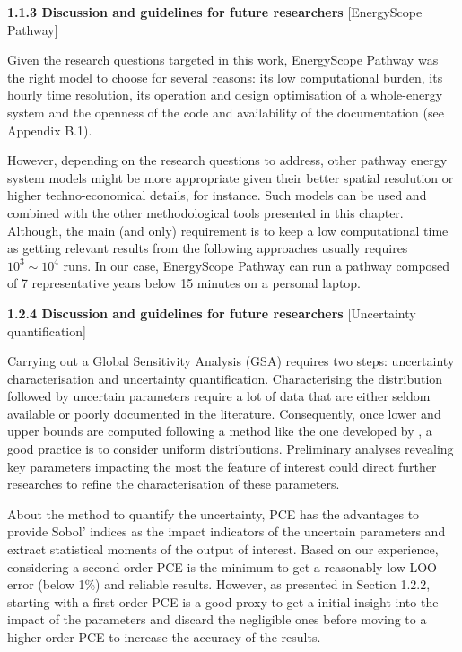 \documentclass[12pt,a4paper]{article}
\begin{document}
\begin{mdframed}[style=manuscript]
\textbf{1.1.3 Discussion and guidelines for future researchers} [EnergyScope Pathway]

Given the research questions targeted in this work, EnergyScope Pathway was the right model to choose for several reasons: its low computational burden, its hourly time resolution, its operation and design optimisation of a whole-energy system and the openness of the code and availability of the documentation (see Appendix B.1). 

However, depending on the research questions to address, other pathway energy system models might be more appropriate given their better spatial resolution or higher techno-economical details, for instance. Such models can be used and combined with the other methodological tools presented in this chapter. Although, the main (and only) requirement is to keep a low computational time as getting relevant results from the following approaches usually requires $10^3\sim 10^4$ runs.  In our case, EnergyScope Pathway can run a pathway composed of 7 representative years below 15 minutes on a personal laptop.
\end{mdframed}

\begin{mdframed}[style=manuscript]
\textbf{1.2.4 Discussion and guidelines for future researchers} [Uncertainty quantification]

Carrying out a Global Sensitivity Analysis (GSA) requires two steps: uncertainty characterisation and uncertainty quantification. Characterising the distribution followed by uncertain parameters require a lot of data that are either seldom available or poorly documented in the literature. Consequently, once lower and upper bounds are computed following a method like the one developed by \citet{Moret2017}, a good practice is to consider uniform distributions. Preliminary analyses revealing key parameters impacting the most the feature of interest could direct further researches to refine the characterisation of these parameters.

About the method to quantify the uncertainty, PCE has the advantages to provide Sobol' indices as the impact indicators of the uncertain parameters and extract statistical moments of the output of interest. Based on our experience, considering a second-order PCE is the minimum to get a reasonably low LOO error (below 1\%) and reliable results. However, as presented in Section 1.2.2, starting with a first-order PCE is a good proxy to get a initial insight into the impact of the parameters and discard the negligible ones before moving to a higher order PCE to increase the accuracy of the results.
\end{mdframed}
\end{document}
